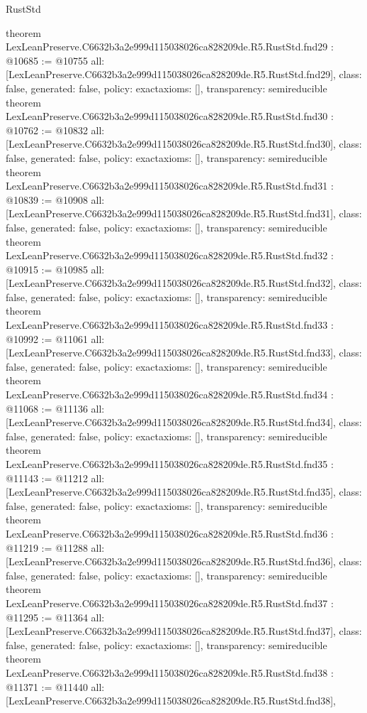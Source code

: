 \begin{lexlean}{RustStd}
\begin{coremodule}
{}
theorem LexLeanPreserve.C6632b3a2e999d115038026ca828209de.R5.RustStd.fnd29 : @10685 := @10755 {
  all: [LexLeanPreserve.C6632b3a2e999d115038026ca828209de.R5.RustStd.fnd29],
  class: false,
  generated: false,
  policy: exact{axioms: []},
  transparency: semireducible
}
theorem LexLeanPreserve.C6632b3a2e999d115038026ca828209de.R5.RustStd.fnd30 : @10762 := @10832 {
  all: [LexLeanPreserve.C6632b3a2e999d115038026ca828209de.R5.RustStd.fnd30],
  class: false,
  generated: false,
  policy: exact{axioms: []},
  transparency: semireducible
}
theorem LexLeanPreserve.C6632b3a2e999d115038026ca828209de.R5.RustStd.fnd31 : @10839 := @10908 {
  all: [LexLeanPreserve.C6632b3a2e999d115038026ca828209de.R5.RustStd.fnd31],
  class: false,
  generated: false,
  policy: exact{axioms: []},
  transparency: semireducible
}
theorem LexLeanPreserve.C6632b3a2e999d115038026ca828209de.R5.RustStd.fnd32 : @10915 := @10985 {
  all: [LexLeanPreserve.C6632b3a2e999d115038026ca828209de.R5.RustStd.fnd32],
  class: false,
  generated: false,
  policy: exact{axioms: []},
  transparency: semireducible
}
theorem LexLeanPreserve.C6632b3a2e999d115038026ca828209de.R5.RustStd.fnd33 : @10992 := @11061 {
  all: [LexLeanPreserve.C6632b3a2e999d115038026ca828209de.R5.RustStd.fnd33],
  class: false,
  generated: false,
  policy: exact{axioms: []},
  transparency: semireducible
}
theorem LexLeanPreserve.C6632b3a2e999d115038026ca828209de.R5.RustStd.fnd34 : @11068 := @11136 {
  all: [LexLeanPreserve.C6632b3a2e999d115038026ca828209de.R5.RustStd.fnd34],
  class: false,
  generated: false,
  policy: exact{axioms: []},
  transparency: semireducible
}
theorem LexLeanPreserve.C6632b3a2e999d115038026ca828209de.R5.RustStd.fnd35 : @11143 := @11212 {
  all: [LexLeanPreserve.C6632b3a2e999d115038026ca828209de.R5.RustStd.fnd35],
  class: false,
  generated: false,
  policy: exact{axioms: []},
  transparency: semireducible
}
theorem LexLeanPreserve.C6632b3a2e999d115038026ca828209de.R5.RustStd.fnd36 : @11219 := @11288 {
  all: [LexLeanPreserve.C6632b3a2e999d115038026ca828209de.R5.RustStd.fnd36],
  class: false,
  generated: false,
  policy: exact{axioms: []},
  transparency: semireducible
}
theorem LexLeanPreserve.C6632b3a2e999d115038026ca828209de.R5.RustStd.fnd37 : @11295 := @11364 {
  all: [LexLeanPreserve.C6632b3a2e999d115038026ca828209de.R5.RustStd.fnd37],
  class: false,
  generated: false,
  policy: exact{axioms: []},
  transparency: semireducible
}
theorem LexLeanPreserve.C6632b3a2e999d115038026ca828209de.R5.RustStd.fnd38 : @11371 := @11440 {
  all: [LexLeanPreserve.C6632b3a2e999d115038026ca828209de.R5.RustStd.fnd38],
}
\end{coremodule}
\end{lexlean}
